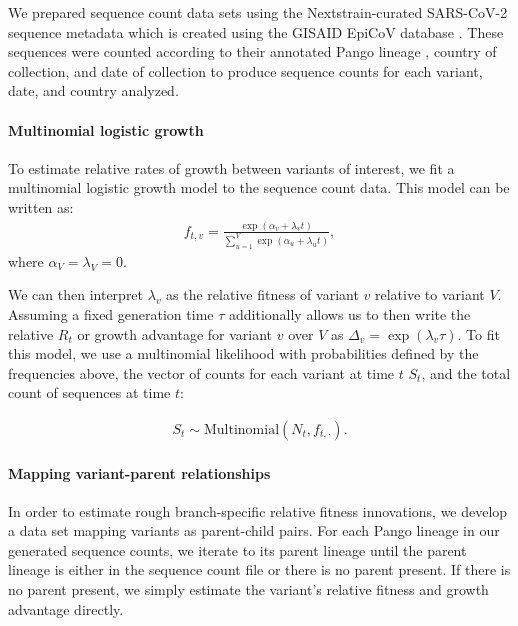 We prepared sequence count data sets using the Nextstrain-curated SARS-CoV-2 sequence metadata \cite{Hadfield2018} which is created using the GISAID EpiCoV database \cite{khare2021gisaid}.
These sequences were counted according to their annotated Pango lineage \cite{aksamentov2021nextclade}, country of collection, and date of collection to produce sequence counts for each variant, date, and country analyzed.

\paragraph{Multinomial logistic growth}

To estimate relative rates of growth between variants of interest, we fit a multinomial logistic growth model to the sequence count data.
This model can be written as:
\begin{align*}
    f_{t, v} = \frac{\exp(\alpha_{v} + \lambda_{v} t)}{\sum_{u=1}^{V} \exp(\alpha_{u} + \lambda_{u} t)},
\end{align*}
where $\alpha_{V} = \lambda_{V} = 0$.

We can then interpret $\lambda_{v}$ as the relative fitness of variant $v$ relative to variant $V$.
Assuming a fixed generation time $\tau$ additionally allows us to then write the relative $R_{t}$ or growth advantage for variant $v$ over $V$ as $\Delta_{v} = \exp(\lambda_{v}\tau)$.
To fit this model, we use a multinomial likelihood with probabilities defined by the frequencies above, the vector of counts for each variant at time $t$ $S_{t}$, and the total count of sequences at time $t$:

\begin{align*}
    S_{t} \sim \text{Multinomial}(N_{t}, f_{t, \cdot}).
\end{align*}

\paragraph{Mapping variant-parent relationships}%

In order to estimate rough branch-specific relative fitness innovations, we develop a data set mapping variants as parent-child pairs.
For each Pango lineage in our generated sequence counts, we iterate to its parent lineage until the parent lineage is either in the sequence count file or there is no parent present.
If there is no parent present, we simply estimate the variant's relative fitness and growth advantage directly.

